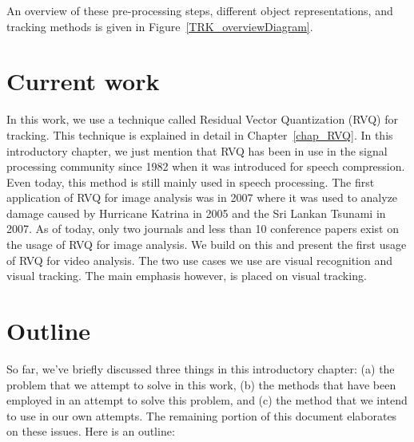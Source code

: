 An overview of these pre-processing steps, different object representations, and tracking methods is given in Figure~\ref{TRK_overviewDiagram}.

\section{Current work}
In this work, we use a technique called Residual Vector Quantization (RVQ) for tracking.  This technique is explained in detail in Chapter~\ref{chap_RVQ}.  In this introductory chapter, we just mention that RVQ has been in use in the signal processing community since 1982 \cite{1982_CNF_SpeechRVQ_JuangGray} when it was introduced for speech compression.  Even today, this method is still mainly used in speech processing.  The first application of RVQ for image analysis was in 2007 \cite{2007_JNL_IDDM_Barnes} where it was used to analyze damage caused by Hurricane Katrina in 2005 and the Sri Lankan Tsunami in 2007.  As of today, only two journals and less than 10 conference papers exist on the usage of RVQ for image analysis.  We build on this and present the first usage of RVQ for video analysis.  The two use cases we use are visual recognition and visual tracking.  The main emphasis however, is placed on visual tracking.

\section{Outline}
So far, we've briefly discussed three things in this introductory chapter: (a) the problem that we attempt to solve in this work, (b) the methods that have been employed in an attempt to solve this problem, and (c) the method that we intend to use in our own attempts.  The remaining portion of this document elaborates on these issues.  Here is an outline:

